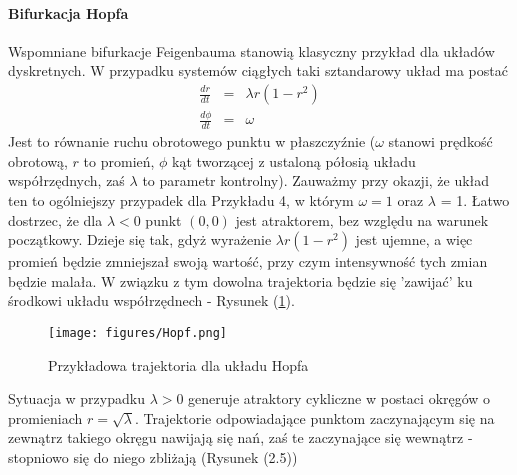 \documentclass[12pt, twoside]{book}
\begin{document}
\paragraph{Bifurkacja Hopfa}
Wspomniane bifurkacje Feigenbauma stanowią klasyczny przykład dla układów dyskretnych. W przypadku systemów ciągłych taki sztandarowy układ ma postać
\begin{equation}
\begin{array}{rcl} 
\frac{dr}{dt} & = & \lambda r(1-r^2) \\ 
\frac{d\phi}{dt} & = & \omega
\end{array}
\end{equation}
Jest to równanie ruchu obrotowego punktu w płaszczyźnie ($ \omega $ stanowi prędkość obrotową, $ r $ to promień, $ \phi $ kąt tworzącej z ustaloną półosią układu współrzędnych, zaś $ \lambda  $ to parametr kontrolny). Zauważmy przy okazji, że układ ten to ogólniejszy przypadek dla Przykładu 4, w którym $ \omega = 1 $ oraz $ \lambda $ = 1.\newline
Łatwo dostrzec, że dla $ \lambda < 0 $ punkt $ (0,0) $ jest atraktorem, bez względu na warunek początkowy. Dzieje się tak, gdyż wyrażenie $ \lambda r(1-r^{2}) $ jest ujemne, a więc promień będzie zmniejszał swoją wartość, przy czym intensywność tych zmian będzie malała. W związku z tym dowolna trajektoria będzie się 'zawijać' ku środkowi układu współrzędnech - Rysunek (\ref{Fig9}).
\begin{figure}[H]
	\texttt{[image: figures/Hopf.png]} 
	\centering
	\caption{Przykładowa trajektoria dla układu Hopfa}
	\label{Fig9}
\end{figure}
Sytuacja w przypadku $ \lambda >0 $ generuje atraktory cykliczne w postaci okręgów o promieniach $ r = \sqrt{\lambda} $. Trajektorie odpowiadające punktom zaczynającym się na zewnątrz takiego okręgu nawijają się nań, zaś te zaczynające się wewnątrz - stopniowo się do niego zbliżają (Rysunek (2.5))
\end{document}
